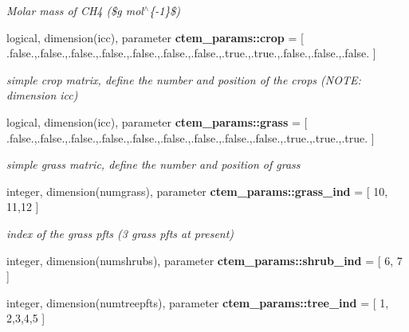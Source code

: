 \begin{DoxyCompactItemize}
\begin{DoxyCompactList}\small\item\em Molar mass of C\+H4 (\$g mol$^\wedge$\{-\/1\}\$) \end{DoxyCompactList}\item 
\hypertarget{namespacectem__params_ae0f698eacc7fc8a7cfd68a15a90b4e8f}{}logical, dimension(icc), parameter {\bfseries ctem\+\_\+params\+::crop} = \mbox{[} .false.,.false.,.false.,.false.,.false.,.false.,.false.,.true.,.true.,.false.,.false.,.false. \mbox{]}\label{namespacectem__params_ae0f698eacc7fc8a7cfd68a15a90b4e8f}

\begin{DoxyCompactList}\small\item\em simple crop matrix, define the number and position of the crops (N\+O\+T\+E\+: dimension icc) \end{DoxyCompactList}\item 
\hypertarget{namespacectem__params_aa3cfb14989b4145f054926e8eea3382f}{}logical, dimension(icc), parameter {\bfseries ctem\+\_\+params\+::grass} = \mbox{[} .false.,.false.,.false.,.false.,.false.,.false.,.false.,.false.,.false.,.true.,.true.,.true. \mbox{]}\label{namespacectem__params_aa3cfb14989b4145f054926e8eea3382f}

\begin{DoxyCompactList}\small\item\em simple grass matric, define the number and position of grass \end{DoxyCompactList}\item 
\hypertarget{namespacectem__params_ac0e6330dd6b8408f75fb25c1a7aa7fcb}{}integer, dimension(numgrass), parameter {\bfseries ctem\+\_\+params\+::grass\+\_\+ind} = \mbox{[} 10, 11,12 \mbox{]}\label{namespacectem__params_ac0e6330dd6b8408f75fb25c1a7aa7fcb}

\begin{DoxyCompactList}\small\item\em index of the grass pfts (3 grass pfts at present) \end{DoxyCompactList}\item 
\hypertarget{namespacectem__params_aec72ba91dc7f74a089a1dfd41f940640}{}integer, dimension(numshrubs), parameter {\bfseries ctem\+\_\+params\+::shrub\+\_\+ind} = \mbox{[} 6, 7 \mbox{]}\label{namespacectem__params_aec72ba91dc7f74a089a1dfd41f940640}

\item 
\hypertarget{namespacectem__params_a0e1c44fcb6eedc488eba03f610e542dd}{}integer, dimension(numtreepfts), parameter {\bfseries ctem\+\_\+params\+::tree\+\_\+ind} = \mbox{[} 1, 2,3,4,5 \mbox{]}\label{namespacectem__params_a0e1c44fcb6eedc488eba03f610e542dd}


\end{DoxyCompactItemize}
